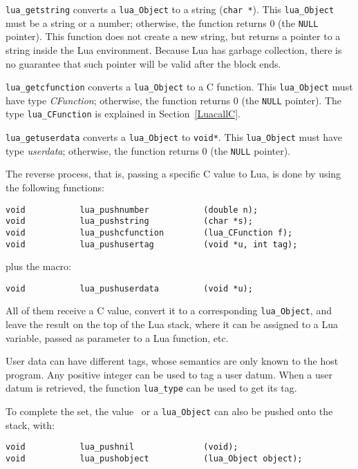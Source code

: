 \verb'lua_getstring' converts a \verb'lua_Object' to a string (\verb'char *').
This \verb'lua_Object' must be a string or a number;
otherwise, the function returns 0 (the \verb|NULL| pointer).
This function does not create a new string, but returns a pointer to
a string inside the Lua environment.
Because Lua has garbage collection, there is no guarantee that such
pointer will be valid after the block ends.

\verb'lua_getcfunction' converts a \verb'lua_Object' to a C function.
This \verb'lua_Object' must have type {\em CFunction\/};
otherwise, the function returns 0 (the \verb|NULL| pointer).
The type \verb'lua_CFunction' is explained in Section~\ref{LuacallC}.

\verb'lua_getuserdata' converts a \verb'lua_Object' to \verb'void*'.
This \verb'lua_Object' must have type {\em userdata\/};
otherwise, the function returns 0 (the \verb|NULL| pointer).

The reverse process, that is, passing a specific C value to Lua,
is done by using the following functions:
\begin{verbatim}
void           lua_pushnumber           (double n);
void           lua_pushstring           (char *s);
void           lua_pushcfunction        (lua_CFunction f);
void           lua_pushusertag          (void *u, int tag);
\end{verbatim}
plus the macro:
\begin{verbatim}
void           lua_pushuserdata         (void *u);
\end{verbatim}
All of them receive a C value,
convert it to a corresponding \verb'lua_Object',
and leave the result on the top of the Lua stack,
where it can be assigned to a Lua variable,
passed as parameter to a Lua function, etc. \label{pushing}

User data can have different tags,
whose semantics are only known to the host program.
Any positive integer can be used to tag a user datum.
When a user datum is retrieved,
the function \verb'lua_type' can be used to get its tag.

To complete the set,
the value \nil\ or a \verb'lua_Object' can also be pushed onto the stack,
with:
\begin{verbatim}
void           lua_pushnil              (void);
void           lua_pushobject           (lua_Object object);
\end{verbatim}


